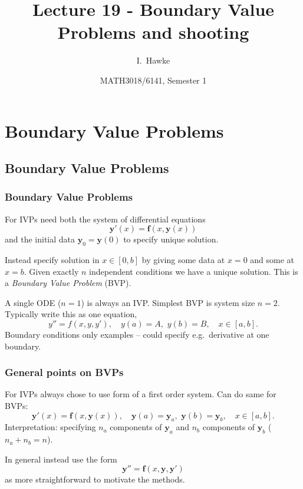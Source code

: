 \documentclass{beamer}
\title[Lecture 19] %
{Lecture 19 - Boundary Value Problems and shooting}
\author[I. Hawke] %
{I.~Hawke}
\institute[University of Southampton] %
{
  School of Mathematics, \\
  University of Southampton, UK
}
\date[Semester 1] %
{MATH3018/6141, Semester 1}
\newcommand{\by}{{\boldsymbol{y}}}
\newcommand{\bfm}[1]{{\boldsymbol{#1}}}
\begin{document}
\begin{frame}
  \titlepage
\end{frame}

\section{Boundary Value Problems}

\subsection{Boundary Value Problems}

\begin{frame}
  \frametitle{Boundary Value Problems}

  For IVPs need both the system of differential equations
  \begin{equation*}
    \by'(x) = \bfm{f}(x, \by(x))
  \end{equation*}
  and the initial data $\by_0 = \by(0)$ to specify unique solution. \pause

  \vspace{1ex}

  Instead specify solution in $x \in [0, b]$ by giving some data at
  $x=0$ and some at $x=b$. Given exactly $n$ independent conditions we have
  a unique solution. This is a \emph{Boundary Value Problem}
  (BVP). \pause

  \vspace{1ex}

  A single ODE ($n=1$) is always an IVP.  Simplest BVP is system size
  $n=2$. Typically write this as one equation,
  \begin{equation*}
    y'' = f(x, y, y'), \quad y(a) = A, \,\, y(b) = B, \quad x \in [a,b].
  \end{equation*} \pause
  Boundary conditions only examples -- could specify e.g.\
  derivative at one boundary.

\end{frame}

\begin{frame}
  \frametitle{General points on BVPs}

  For IVPs always chose to use form of a first order system.  Can do
  same for BVPs:
  \begin{equation*}
    \by'(x) = \bfm{f}(x, \by(x)), \quad \by(a) = \by_a, \,\,\by(b) =
    \by_b, \quad x \in [a,b].
  \end{equation*}
  Interpretation: specifying $n_a$ components of $\by_a$ and $n_b$
  components of $\by_b$ ($n_a + n_b = n$). \pause

  \vspace{1ex}

  In general instead use the form
  \begin{equation*}
    \by'' = \bfm{f} \left( x, \by, \by' \right)
  \end{equation*}
  as more straightforward to motivate the methods.

\end{frame}
\end{document}
